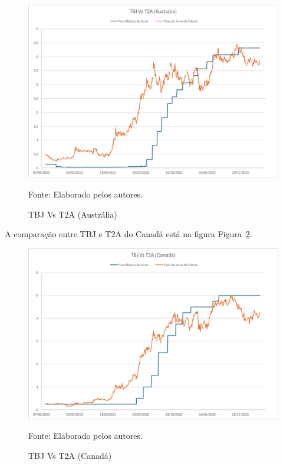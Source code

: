 \documentclass[a4paper,12pt]{article}[abntex2]
\begin{document}
\begin{figure}[H]
    \centering
    \caption{TBJ Vs T2A (Austrália)} 
    \includegraphics[width=1.0\textwidth]{TBJ Vs T2A (Austrália).png}
    \label{fig:TBJ Vs T2A (Austrália)}
    
    \footnotesize{Fonte: Elaborado pelos autores.}
    \end{figure}

A comparação entre TBJ e T2A do Canadá está na figura Figura~\ref{fig:TBJ Vs T2A (Canadá)}.

\begin{figure}[H]
    \centering
    \caption{TBJ Vs T2A (Canadá)} 
    \includegraphics[width=1.0\textwidth]{TBJ Vs T2A (Canadá).png}
    \label{fig:TBJ Vs T2A (Canadá)}
    
    \footnotesize{Fonte: Elaborado pelos autores.}
    \end{figure}
\end{document}
